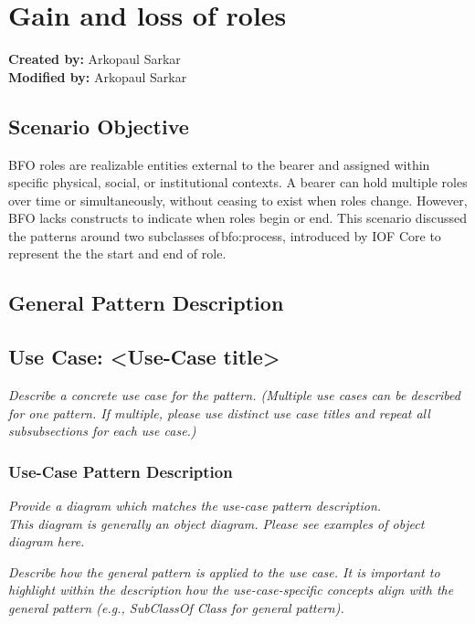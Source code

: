 \section{Gain and loss of roles}

\textbf{Created by:} Arkopaul Sarkar \\
\textbf{Modified by:} Arkopaul Sarkar \\

\subsection*{Scenario Objective}

BFO roles are realizable entities external to the bearer and assigned within specific physical, social, or institutional contexts. A bearer can hold multiple roles over time or simultaneously, without ceasing to exist when roles change. However, BFO lacks constructs to indicate when roles begin or end. This scenario discussed the patterns around two subclasses of bfo:process, introduced by IOF Core to represent the the start and end of role. 

\subsection*{General Pattern Description}






\subsection*{Use Case: <Use-Case title>}
 \textit{ 
Describe a concrete use case for the pattern. (Multiple use cases can be described for one pattern. If multiple, please use distinct use case titles and repeat all subsubsections for each use case.)
  }

\subsubsection*{Use-Case Pattern Description}
 \textit{ 
Provide a diagram which matches the use-case pattern description. \\
\noindent \textit{This diagram is generally an object diagram. Please see examples of object diagram here.}
  }

 \textit{ 
Describe how the general pattern is applied to the use case. It is important to highlight within the description how the use-case-specific concepts align with the general pattern (e.g., SubClassOf Class for general pattern).
  }


